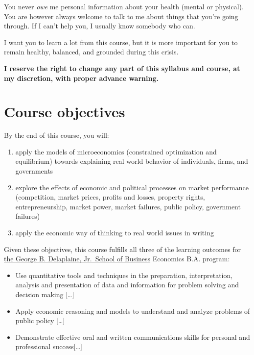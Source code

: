 \documentclass{article}
\providecommand{\tightlist}{%
  \setlength{\itemsep}{0pt}\setlength{\parskip}{0pt}}
\begin{document}
You never \emph{owe} me personal information about your health (mental
or physical). You are however always welcome to talk to me about things
that you're going through. If I can't help you, I usually know somebody
who can.

I want you to learn a lot from this course, but it is more important for
you to remain healthy, balanced, and grounded during this crisis.

\textbf{I reserve the right to change any part of this syllabus and
course, at my discretion, with proper advance warning.}

\hypertarget{course-objectives}{%
\section{Course objectives}\label{course-objectives}}

{By the end of this course,} you will:

\begin{enumerate}
\def\labelenumi{\arabic{enumi}.}
\tightlist
\item
  apply the models of microeconomics (constrained optimization and
  equilibrium) towards explaining real world behavior of individuals,
  firms, and governments
\item
  explore the effects of economic and political processes on market
  performance (competition, market prices, profits and losses, property
  rights, entrepreneurship, market power, market failures, public
  policy, government failures)
\item
  apply the economic way of thinking to real world issues in writing
\end{enumerate}

Given these objectives, this course fulfills all three of the learning
outcomes for
\href{https://www.hood.edu/academics/departments/george-b-delaplaine-jr-school-business/student-learning-outcomes}{the
George B. Delaplaine, Jr.~School of Business} Economics B.A. program:

\begin{itemize}
\tightlist
\item
  Use quantitative tools and techniques in the preparation,
  interpretation, analysis and presentation of data and information for
  problem solving and decision making {[}\ldots{]}
\item
  Apply economic reasoning and models to understand and analyze problems
  of public policy {[}\ldots{]}
\item
  Demonstrate effective oral and written communications skills for
  personal and professional success{[}\ldots{]}
\end{itemize}
\end{document}
